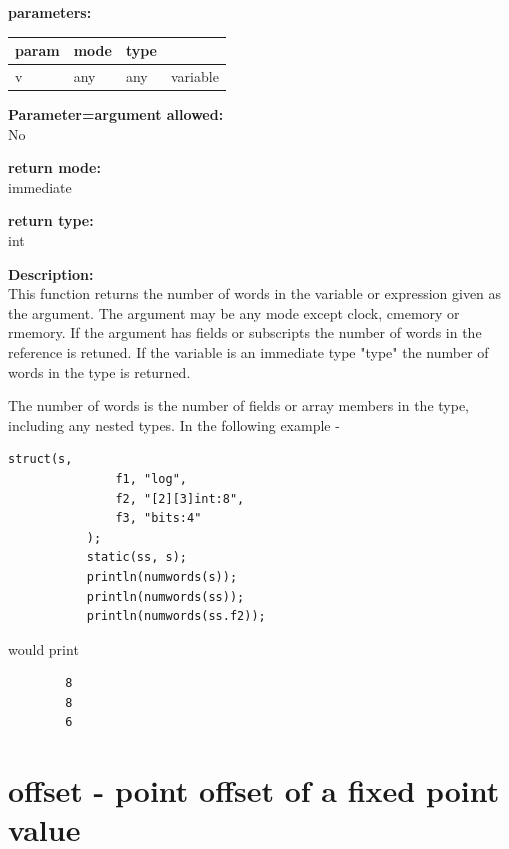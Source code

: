         {\bf parameters:} \\
        \begin{tabular}{| l | l | l | l |}
        \hline
        param  & mode & type & \\
        \hline \hline
        v & any & any & variable  \\ \hline
        \end{tabular}
        
        {\bf Parameter=argument allowed:} \\
        No
        
        {\bf return mode:} \\
        immediate

        {\bf return type:} \\
        int
        
        {\bf Description:} \\
        This function returns the number of words in the variable or expression
        given as the argument. The argument may be any mode except clock,
        cmemory or rmemory. If the argument has fields or subscripts the number
        of words in the reference is retuned. If the variable is an immediate
        type "type" the number of words in the type is returned.
        
        The number of words is the number of fields or array members in the
        type, including any nested types. In the following example -
        \begin{lstlisting}[gobble=8, language=threepl]
           struct(s,
               f1, "log",
               f2, "[2][3]int:8",
               f3, "bits:4"
           );
           static(ss, s);
           println(numwords(s));
           println(numwords(ss));
           println(numwords(ss.f2));
        \end{lstlisting}
        would print
        \begin{verbatim}
        8
        8
        6
        \end{verbatim}

    


    \section{offset - point offset of a fixed point value}\label{sec:ifoffset}
        
